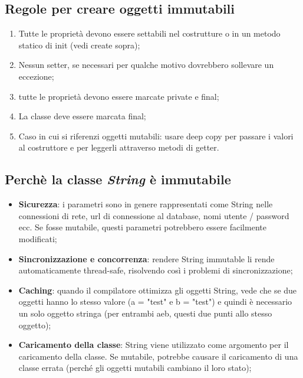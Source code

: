 \subsection{Regole per creare oggetti immutabili}
\begin{enumerate}
	\item Tutte le proprietà devono essere settabili nel costrutture o in un metodo statico di init (vedi create sopra);
	\item Nessun setter, se necessari per qualche motivo dovrebbero sollevare un eccezione;
	\item tutte le proprietà devono essere marcate private e final;
	\item La classe deve essere marcata final;
	\item Caso in cui si riferenzi oggetti mutabili: usare deep copy per passare i valori al costruttore e per leggerli attraverso metodi di getter.
	\end{enumerate}

\subsection{Perchè la classe \textit{String} è immutabile}
\begin{itemize}
	\item \textbf{Sicurezza}: i parametri sono in genere rappresentati come String nelle connessioni di rete, url di connessione al database, nomi utente / password ecc. Se fosse mutabile, questi parametri potrebbero essere facilmente modificati;
	\item \textbf{Sincronizzazione e concorrenza}: rendere String immutable li rende automaticamente thread-safe, risolvendo così i problemi di sincronizzazione;
	\item \textbf{Caching}: quando il compilatore ottimizza gli oggetti String, vede che se due oggetti hanno lo stesso valore (a = "test" e b = "test") e quindi è necessario un solo oggetto stringa (per entrambi aeb, questi due punti allo stesso oggetto);
	\item \textbf{Caricamento della classe}: String viene utilizzato come argomento per il caricamento della classe. Se mutabile, potrebbe causare il caricamento di una classe errata (perché gli oggetti mutabili cambiano il loro stato);
	\end{itemize}